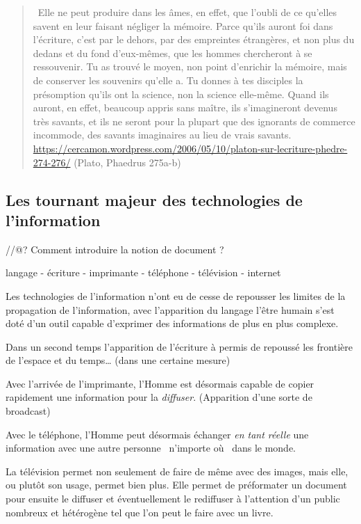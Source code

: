 \begin{quote}
\og{}~Elle ne peut produire dans les âmes, en effet, que l’oubli de ce qu’elles 
savent en leur faisant négliger la mémoire. Parce qu’ils auront foi dans 
l’écriture, c’est par le dehors, par des empreintes étrangères, et non plus du 
dedans et du fond d’eux-mêmes, que les hommes chercheront à se ressouvenir. Tu 
as trouvé le moyen, non point d’enrichir la mémoire, mais de conserver les 
souvenirs qu’elle a. Tu donnes à tes disciples la présomption qu’ils ont la 
science, non la science elle-même. Quand ils auront, en effet, beaucoup appris 
sans maître, ils s’imagineront devenus très savants, et ils ne seront pour la 
plupart que des ignorants de commerce incommode, des savants imaginaires au lieu
 de vrais savants.~\fg{}
\url{https://cercamon.wordpress.com/2006/05/10/platon-sur-lecriture-phedre-274-276/}
(Plato, Phaedrus 275a-b)
\end{quote}

\subsection{Les tournant majeur des technologies de l'information}
//@? Comment introduire la notion de document ?

langage - écriture - imprimante - téléphone - télévision - internet


Les technologies de l'information n'ont eu de cesse de repousser les limites de
la propagation de l'information, avec l'apparition du langage l'être humain
s'est doté d'un outil capable d'exprimer des informations de plus en plus
complexe. 

Dans un second temps l'apparition de l'écriture à permis de repoussé les
frontière de l'espace et du temps… (dans une certaine mesure)

Avec l'arrivée de l'imprimante, l'Homme est désormais capable de copier
rapidement une information pour la \emph{diffuser}. (Apparition d'une sorte
de broadcast)

Avec le téléphone, l'Homme peut désormais échanger \emph{en tant réelle} une 
information avec une autre personne \og{}~n'importe où~\fg{} dans le monde.

La télévision permet non seulement de faire de même avec des images, mais elle,
ou plutôt son usage, permet bien plus. Elle permet de préformater un document pour ensuite le
diffuser et éventuellement le rediffuser à l'attention d'un public nombreux et
hétérogène tel que l'on peut le faire avec un livre.


